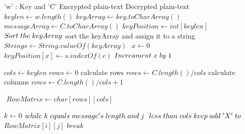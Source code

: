 \documentclass[twoside,twocolumn]{article}
\begin{document}
\begin{algorithm}
  \caption{}\label{}
  \begin{algorithmic}[1]
  	\footnotesize
    \Require 'w' : Key and 'C' Encrypted plain-text
    \Ensure Decrypted plain-text
      \State $keylen \gets w.length()$
      \State $keyArray \gets key.toCharArray() $
      \State $messageArray \gets C.toCharArray() $
      \State $keyPosition \gets int [keylen]$
      \State \footnotesize$ $
	  \State $Sort\hspace{0.1cm} the \hspace{0.1cm}keyArray$  \Comment \tiny{sort the keyArray and assign it to a string}
	  \State\footnotesize $String s \gets String.valueOf(keyArray)$	  
	  \State \footnotesize$ $
	  \State $x \gets 0$
        \State $keyPosition[x] \gets s.indexOf(c)$
        \State $Increament \hspace{0.1cm} x \hspace{0.1cm} by \hspace{0.1cm}1$	
      \EndFor
     
      \State $cols \gets keylen$
      \State $rows \gets 0$
	   \Comment \tiny{calculate rows}
        \State\footnotesize $rows \gets C.length() / cols$
      \Else \Comment \tiny{calculate columns}
        \State \footnotesize$rows \gets C.length() / cols + 1$
     \EndIf
     
      \State \footnotesize$ $
      \State  $RowMatrix \gets char[rows][cols] $
       
 
	  \State $k \gets 0$
        	   \State $while \hspace{0.1cm} k \hspace{0.1cm} equals \hspace{0.1cm} message's \hspace{0.1cm} length \hspace{0.1cm} and \hspace{0.1cm} j \hspace{0.1cm}   $
        	   \State $less \hspace{0.1cm}than \hspace{0.1cm} cols \hspace{0.1cm} keep \hspace{0.1cm}add \hspace{0.1cm}'X' \hspace{0.1cm} to \hspace{0.1cm}$
        	   \State $RowMatrix[i][j]$
        	   \State $break$
        	  

\end{algorithmic}
\end{algorithm}
\end{document}
